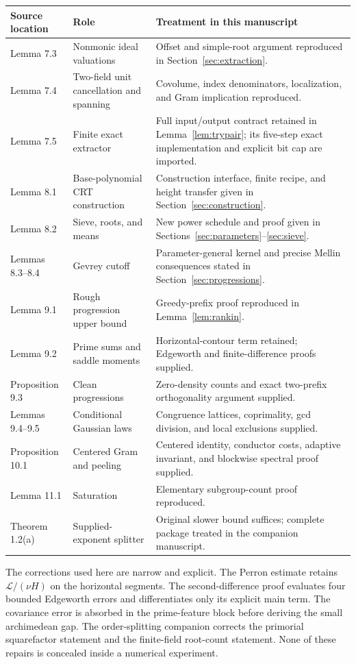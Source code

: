 \begin{longtable}{p{}p{}p{}}
\toprule
Source location & Role & Treatment in this manuscript \\
\midrule
\endhead
Lemma 7.3 & Nonmonic ideal valuations & Offset and simple-root
argument reproduced in Section~\ref{sec:extraction}. \\
Lemma 7.4 & Two-field unit cancellation and spanning & Covolume,
index denominators, localization, and Gram implication reproduced. \\
Lemma 7.5 & Finite exact extractor & Full input/output contract
retained in Lemma~\ref{lem:trypair}; its five-step exact implementation
and explicit bit cap are imported. \\
Lemma 8.1 & Base-polynomial CRT construction & Construction interface,
finite recipe, and height transfer given in
Section~\ref{sec:construction}. \\
Lemma 8.2 & Sieve, roots, and means & New power schedule and proof
given in Sections~\ref{sec:parameters}--\ref{sec:sieve}. \\
Lemmas 8.3--8.4 & Gevrey cutoff & Parameter-general kernel and
precise Mellin consequences stated in Section~\ref{sec:progressions}. \\
Lemma 9.1 & Rough progression upper bound & Greedy-prefix proof
reproduced in Lemma~\ref{lem:rankin}. \\
Lemma 9.2 & Prime sums and saddle moments & Horizontal-contour term
retained; Edgeworth and finite-difference proofs supplied. \\
Proposition 9.3 & Clean progressions & Zero-density counts and exact
two-prefix orthogonality argument supplied. \\
Lemmas 9.4--9.5 & Conditional Gaussian laws & Congruence lattices,
coprimality, gcd division, and local exclusions supplied. \\
Proposition 10.1 & Centered Gram and peeling & Centered identity,
conductor costs, adaptive invariant, and blockwise spectral proof
supplied. \\
Lemma 11.1 & Saturation & Elementary subgroup-count proof reproduced. \\
Theorem 1.2(a) & Supplied-exponent splitter & Original slower bound
suffices; complete package treated in the companion manuscript. \\
\bottomrule
\end{longtable}

The corrections used here are narrow and explicit.  The Perron
estimate retains \(\mathcal L/(\nu H)\) on the horizontal segments.
The second-difference proof evaluates four bounded Edgeworth errors
and differentiates only its explicit main term.  The covariance
error is absorbed in the prime-feature block before deriving the
small archimedean gap.  The order-splitting companion corrects the
primorial squarefactor statement and the finite-field root-count
statement.  None of these repairs is concealed inside a numerical
experiment.

